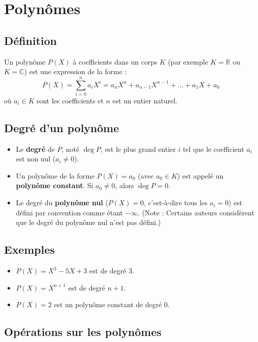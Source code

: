 \documentclass{article}
\begin{document}
\section*{Polynômes}

\subsection*{Définition}
Un polynôme $P(X)$ à coefficients dans un corps $K$ (par exemple $K = \mathbb{R}$ ou $K = \mathbb{C}$) est une expression de la forme :
\[ P(X) = \sum_{i=0}^n a_i X^i = a_n X^n + a_{n-1} X^{n-1} + \dots + a_1 X + a_0 \]
où $a_i \in K$ sont les coefficients et $n$ est un entier naturel.

\subsection*{Degré d'un polynôme}
\begin{itemize}
    \item Le \textbf{degré} de $P$, noté $\deg P$, est le plus grand entier $i$ tel que le coefficient $a_i$ est non nul ($a_i \neq 0$).
    \item Un polynôme de la forme $P(X) = a_0$ (avec $a_0 \in K$) est appelé un \textbf{polynôme constant}. Si $a_0 \neq 0$, alors $\deg P = 0$.
    \item Le degré du \textbf{polynôme nul} ($P(X) = 0$, c'est-à-dire tous les $a_i = 0$) est défini par convention comme étant $-\infty$. (Note : Certains auteurs considèrent que le degré du polynôme nul n'est pas défini.)
\end{itemize}

\subsection*{Exemples}
\begin{itemize}
    \item $P(X) = X^3 - 5X + 3$ est de degré $3$.
    \item $P(X) = X^{n+1}$ est de degré $n+1$.
    \item $P(X) = 2$ est un polynôme constant de degré $0$.
\end{itemize}

\subsection*{Opérations sur les polynômes}
\end{document}
